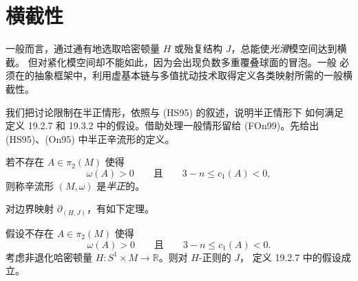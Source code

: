 \section{横截性}
\label{sec:hamiltonian-floer-transversality}

一般而言，通过通有地选取哈密顿量 $H$ 或殆复结构 $J$，总能使\emph{光滑}\personFloer{}模空间达到横截。
但对紧化\personFloer{}模空间却不能如此，因为会出现负\personChern{}数多重覆叠球面的冒泡。一般
必须在\termKuranishiStructure{}的抽象框架中，利用虚基本链与多值扰动技术取得定义各类\personFloer{}映射所需的一般横截性。

我们把讨论限制在半正情形，依照\personHofer{}与\personSalamon{} (HS95) 的叙述，说明半正情形下
如何满足定义 19.2.7 和 19.3.2 中的假设。借助\termKuranishiStructure{}处理一般情形留给
(FOn99)。先给出 (HS95)、(On95) 中半正辛流形的定义。

\begin{definition}
\label{def:semipositive-symplectic-manifold}
若不存在 $A\in\pi_2(M)$ 使得
\[
 \omega(A)>0\qquad\text{且}\qquad 3-n\leq c_1(A)<0,
\]
则称辛流形 $(M,\omega)$ 是\emph{半正}的。
\end{definition}

对边界映射 $\partial_{(H,J)}$，有如下定理。

\begin{theorem}
\label{thm:semipositive-boundary-regularity}
假设不存在 $A\in\pi_2(M)$ 使得
\[
 \omega(A)>0\qquad\text{且}\qquad 3-n\leq c_1(A)<0.
\]
考虑非退化哈密顿量 $H:S^1\times M\to\mathbb R$。则对 $H$-正则的 $J$，
定义 19.2.7 中的假设成立。
\end{theorem}

